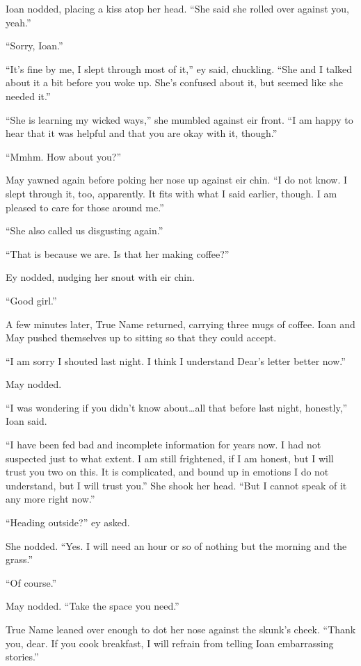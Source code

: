 Ioan nodded, placing a kiss atop her head. ``She said she rolled over against you, yeah.''

``Sorry, Ioan.''

``It's fine by me, I slept through most of it,'' ey said, chuckling. ``She and I talked about it a bit before you woke up. She's confused about it, but seemed like she needed it.''

``She is learning my wicked ways,'' she mumbled against eir front. ``I am happy to hear that it was helpful and that you are okay with it, though.''

``Mmhm. How about you?''

May yawned again before poking her nose up against eir chin. ``I do not know. I slept through it, too, apparently. It fits with what I said earlier, though. I am pleased to care for those around me.''

``She also called us disgusting again.''

``That is because we are. Is that her making coffee?''

Ey nodded, nudging her snout with eir chin.

``Good girl.''

A few minutes later, True Name returned, carrying three mugs of coffee. Ioan and May pushed themselves up to sitting so that they could accept.

``I am sorry I shouted last night. I think I understand Dear's letter better now.''

May nodded.

``I was wondering if you didn't know about\ldots all that before last night, honestly,'' Ioan said.

``I have been fed bad and incomplete information for years now. I had not suspected just to what extent. I am still frightened, if I am honest, but I will trust you two on this. It is complicated, and bound up in emotions I do not understand, but I will trust you.'' She shook her head. ``But I cannot speak of it any more right now.''

``Heading outside?'' ey asked.

She nodded. ``Yes. I will need an hour or so of nothing but the morning and the grass.''

``Of course.''

May nodded. ``Take the space you need.''

True Name leaned over enough to dot her nose against the skunk's cheek. ``Thank you, dear. If you cook breakfast, I will refrain from telling Ioan embarrassing stories.''

